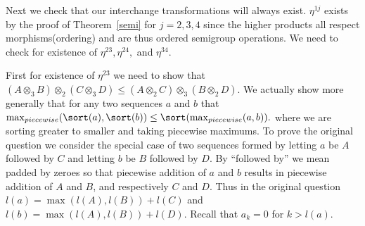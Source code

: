\documentclass{tac}
\begin{document}
{\begin{enumerate}
% 
%
 
 Next we check that our interchange transformations will always exist. $\eta^{1j}$ exists by
 the proof of Theorem~\ref{semi} for $j=2,3,4$ since the higher products all respect morphisms(ordering) and
 are thus ordered semigroup operations. We need to check for existence of $\eta^{23}, \eta^{24},$ and $\eta^{34}.$
 
 First for existence of $\eta^{23}$ we need to show that
   $(A \otimes_3 B)\otimes_2(C \otimes_3 D) \le (A \otimes_2 C)\otimes_3 (B \otimes_2 D).$
      We actually show more generally that for any two sequences $a$ and $b$ that 
   $\max_{piecewise}(\sort(a),\sort(b)) \le \sort(\max_{piecewise}(a,b)).$
where we are sorting greater to smaller and taking piecewise maximums. 
To prove the original question we consider the special case of two sequences formed by letting $a$ be $A$ followed by 
$C$ and letting $b$ be $B$ followed by $D$. By ``followed by'' we mean padded by zeroes so that
piecewise addition of $a$ and $b$ results in piecewise addition of $A$ and $B$, and respectively $C$ and $D.$
Thus in the original question $l(a) = \max(l(A),l(B)) + l(C) $ and $l(b) = \max(l(A),l(B)) + l(D).$
Recall that $a_k = 0$ for $k>l(a)$.


\end{enumerate}}
\end{document}
